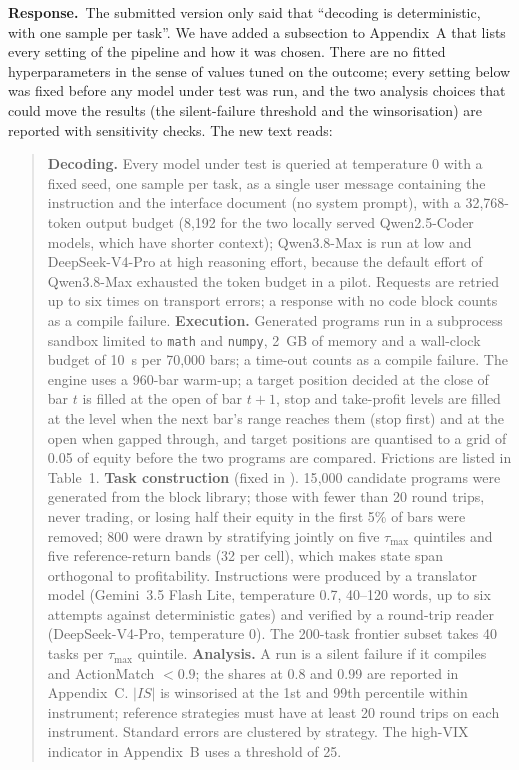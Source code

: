 \documentclass[11pt,a4paper]{article}
\newcommand{\response}{\par\noindent\textbf{Response.}\ }
\newenvironment{newtext}{\par\medskip\noindent\begin{quote}\small\color{blue!60!black}}{\end{quote}\par}
\begin{document}
\response The submitted version only said that ``decoding is deterministic, with one sample per task''. We have added a subsection to Appendix~A that lists every setting of the pipeline and how it was chosen. There are no fitted hyperparameters in the sense of values tuned on the outcome; every setting below was fixed before any model under test was run, and the two analysis choices that could move the results (the silent-failure threshold and the winsorisation) are reported with sensitivity checks. The new text reads:
\begin{newtext}
\textbf{Decoding.} Every model under test is queried at temperature 0 with a fixed seed, one sample per task, as a single user message containing the instruction and the interface document (no system prompt), with a 32{,}768-token output budget (8{,}192 for the two locally served Qwen2.5-Coder models, which have shorter context); Qwen3.8-Max is run at low and DeepSeek-V4-Pro at high reasoning effort, because the default effort of Qwen3.8-Max exhausted the token budget in a pilot. Requests are retried up to six times on transport errors; a response with no code block counts as a compile failure. \textbf{Execution.} Generated programs run in a subprocess sandbox limited to \texttt{math} and \texttt{numpy}, 2~GB of memory and a wall-clock budget of 10~s per 70{,}000 bars; a time-out counts as a compile failure. The engine uses a 960-bar warm-up; a target position decided at the close of bar $t$ is filled at the open of bar $t+1$, stop and take-profit levels are filled at the level when the next bar's range reaches them (stop first) and at the open when gapped through, and target positions are quantised to a grid of 0.05 of equity before the two programs are compared. Frictions are listed in Table~1. \textbf{Task construction} (fixed in \citealp{wang2026minteval}). 15{,}000 candidate programs were generated from the block library; those with fewer than 20 round trips, never trading, or losing half their equity in the first 5\% of bars were removed; 800 were drawn by stratifying jointly on five $\tau_{\max}$ quintiles and five reference-return bands (32 per cell), which makes state span orthogonal to profitability. Instructions were produced by a translator model (Gemini~3.5 Flash Lite, temperature 0.7, 40--120 words, up to six attempts against deterministic gates) and verified by a round-trip reader (DeepSeek-V4-Pro, temperature 0). The 200-task frontier subset takes 40 tasks per $\tau_{\max}$ quintile. \textbf{Analysis.} A run is a silent failure if it compiles and ActionMatch $<0.9$; the shares at 0.8 and 0.99 are reported in Appendix~C. $|IS|$ is winsorised at the 1st and 99th percentile within instrument; reference strategies must have at least 20 round trips on each instrument. Standard errors are clustered by strategy. The high-VIX indicator in Appendix~B uses a threshold of 25.
\end{newtext}
\end{document}
